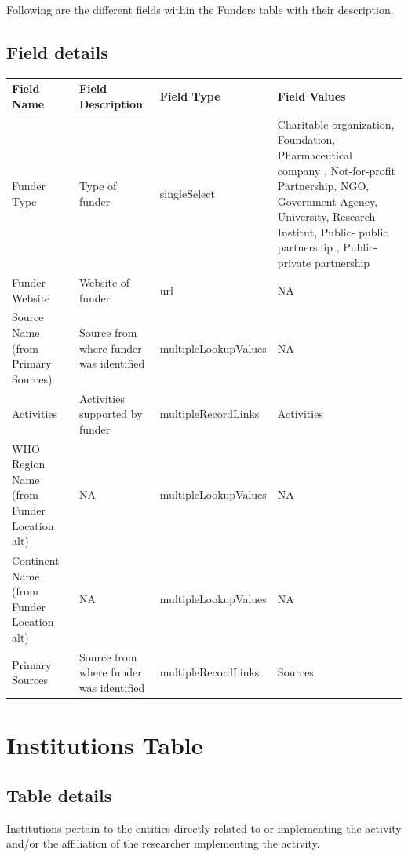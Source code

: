 \documentclass[
]{book}
\begin{document}
Following are the different fields within the Funders table with their description.

\hypertarget{field-details-1}{%
\subsection{Field details}\label{field-details-1}}

\begin{table}
\centering
\begin{tabular}{l|l|l|l}
\hline
\textbf{Field Name} & \textbf{Field Description} & \textbf{Field Type} & \textbf{Field Values}\\
\hline
Funder Type & Type of funder & singleSelect & Charitable organization, Foundation, Pharmaceutical company , Not-for-profit Partnership, NGO, Government Agency, University, Research Institut, Public- public partnership , Public-private partnership\\
\hline
Funder Website & Website of funder & url & NA\\
\hline
Source Name (from Primary Sources) & Source from where funder was identified & multipleLookupValues & NA\\
\hline
Activities & Activities supported by funder & multipleRecordLinks & Activities\\
\hline
WHO Region Name (from Funder Location alt) & NA & multipleLookupValues & NA\\
\hline
Continent Name (from Funder Location alt) & NA & multipleLookupValues & NA\\
\hline
Primary Sources & Source from where funder was identified & multipleRecordLinks & Sources\\
\hline
\end{tabular}
\end{table}

\hypertarget{institutions-table}{%
\section{Institutions Table}\label{institutions-table}}

\hypertarget{table-details-4}{%
\subsection{Table details}\label{table-details-4}}

Institutions pertain to the entities directly related to or implementing the activity and/or the affiliation of the researcher implementing the activity.
\end{document}
